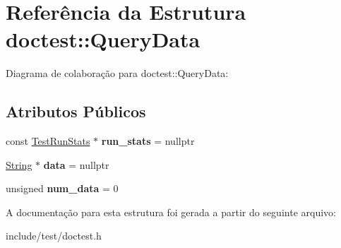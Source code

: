\hypertarget{structdoctest_1_1QueryData}{}\section{Referência da Estrutura doctest\+:\+:Query\+Data}
\label{structdoctest_1_1QueryData}


Diagrama de colaboração para doctest\+:\+:Query\+Data\+:
\subsection*{Atributos Públicos}
\begin{DoxyCompactItemize}
\item 
\mbox{\label{structdoctest_1_1QueryData_a435f443f389323f47cb8b0e4202bbea9}} 
const \hyperlink{structdoctest_1_1TestRunStats}{Test\+Run\+Stats} $\ast$ {\bfseries run\+\_\+stats} = nullptr
\item 
\mbox{\label{structdoctest_1_1QueryData_aaddda141bb8a775589ba6c4a8d363c9b}} 
\hyperlink{classdoctest_1_1String}{String} $\ast$ {\bfseries data} = nullptr
\item 
\mbox{\label{structdoctest_1_1QueryData_af1033338fe975ae3c19b16452401230d}} 
unsigned {\bfseries num\+\_\+data} = 0
\end{DoxyCompactItemize}


A documentação para esta estrutura foi gerada a partir do seguinte arquivo\+:\begin{DoxyCompactItemize}
\item 
include/test/doctest.\+h\end{DoxyCompactItemize}

